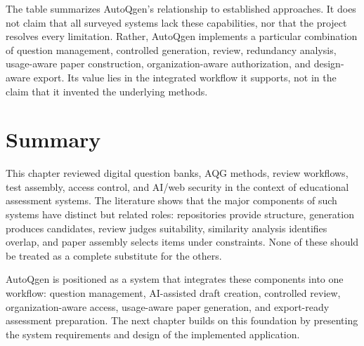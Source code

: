The table summarizes AutoQgen's relationship to established approaches. It does not claim that all surveyed systems lack these capabilities, nor that the project resolves every limitation. Rather, AutoQgen implements a particular combination of question management, controlled generation, review, redundancy analysis, usage-aware paper construction, organization-aware authorization, and design-aware export. Its value lies in the integrated workflow it supports, not in the claim that it invented the underlying methods.

\section{Summary}

This chapter reviewed digital question banks, AQG methods, review workflows, test assembly, access control, and AI/web security in the context of educational assessment systems. The literature shows that the major components of such systems have distinct but related roles: repositories provide structure, generation produces candidates, review judges suitability, similarity analysis identifies overlap, and paper assembly selects items under constraints. None of these should be treated as a complete substitute for the others.

AutoQgen is positioned as a system that integrates these components into one workflow: question management, AI-assisted draft creation, controlled review, organization-aware access, usage-aware paper generation, and export-ready assessment preparation. The next chapter builds on this foundation by presenting the system requirements and design of the implemented application.
